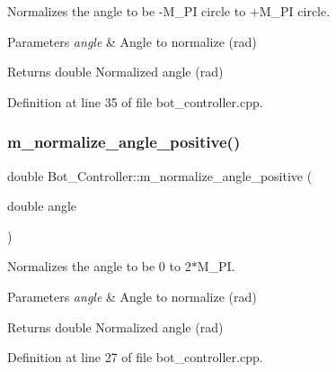 Normalizes the angle to be -\/\+M\+\_\+\+PI circle to +\+M\+\_\+\+PI circle. 


\begin{DoxyParams}{Parameters}
{\em angle} & Angle to normalize (rad) \\
\hline
\end{DoxyParams}
\begin{DoxyReturn}{Returns}
double Normalized angle (rad) 
\end{DoxyReturn}


Definition at line 35 of file bot\+\_\+controller.\+cpp.

\mbox{\label{class_bot___controller_a622aa7b81b1bed82ab5478c7bd9ddd07}} 
\subsubsection{\texorpdfstring{m\+\_\+normalize\+\_\+angle\+\_\+positive()}{m\_normalize\_angle\_positive()}}
{\footnotesize\ttfamily double Bot\+\_\+\+Controller\+::m\+\_\+normalize\+\_\+angle\+\_\+positive (\begin{DoxyParamCaption}\item[{double}]{angle }\end{DoxyParamCaption})\hspace{0.3cm}{\ttfamily [protected]}}



Normalizes the angle to be 0 to 2$\ast$\+M\+\_\+\+PI. 


\begin{DoxyParams}{Parameters}
{\em angle} & Angle to normalize (rad) \\
\hline
\end{DoxyParams}
\begin{DoxyReturn}{Returns}
double Normalized angle (rad) 
\end{DoxyReturn}


Definition at line 27 of file bot\+\_\+controller.\+cpp.

\mbox{\label{class_bot___controller_acc77fd887b8ddc97431a33f3cf72e82c}} 
